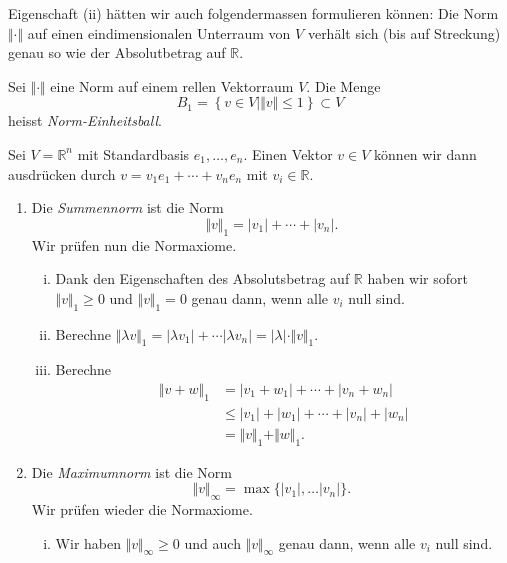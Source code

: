 \documentclass[../main.tex]{subfiles}
\begin{document}
Eigenschaft (ii) hätten wir auch folgendermassen formulieren können:
Die Norm $\Vert \cdot \Vert$ auf einen eindimensionalen Unterraum
von $V$ verhält sich (bis auf Streckung) genau so wie der Absolutbetrag
auf $\mathbb{R}$.

\begin{definition}
  Sei $\Vert \cdot \Vert$ eine Norm auf einem rellen Vektorraum $V$.
  Die Menge
  \[
    B_1 = \left\{v \in V \mid \Vert v \Vert \leq 1\right\} \subset V
  \]
  heisst \emph{Norm-Einheitsball}.
\end{definition}

\begin{examples}
  Sei $V = \mathbb{R}^n$ mit Standardbasis $e_1, \dots, e_n$.
  Einen Vektor $v \in V$ können wir dann ausdrücken durch
  $v = v_1 e_1 + \cdots + v_n e_n$ mit $v_i \in \mathbb{R}$.
  \begin{enumerate}[(1)]
    \item Die \emph{Summennorm} ist die Norm
      \[
        \Vert v \Vert_1 = |v_1| + \cdots + |v_n|.
      \]
      Wir prüfen nun die Normaxiome.
      \begin{enumerate}[(i)]
        \item Dank den Eigenschaften des
          Absolutsbetrag auf $\mathbb{R}$ haben wir sofort 
          $\Vert v \Vert_1 \geq 0$ 
          und $\Vert v \Vert_1 = 0$ genau dann, wenn alle $v_i$ null sind.
        \item Berechne $\Vert \lambda v \Vert_1
          = |\lambda v_1| + \cdots |\lambda v_n| = |\lambda| \cdot
          \Vert v \Vert_1$.
        \item Berechne
          \begin{align*}
            \Vert v + w \Vert_1
            &= |v_1 + w_1| + \cdots + |v_n + w_n| \\
            & \leq |v_1| + |w_1| + \cdots + |v_n| + |w_n| \\
            &= \Vert v \Vert_1 + \Vert w \Vert_1.
          \end{align*}
      \end{enumerate}
    \item Die \emph{Maximumnorm}
      ist die Norm
      \[
        \Vert v \Vert_{\infty}
        = \max \{ |v_1|, \dots |v_n|\}.
      \]
      Wir prüfen wieder die Normaxiome.
      \begin{enumerate}[(i)]
        \item Wir haben $\Vert v \Vert_{\infty} \geq 0$
          und auch $\Vert v \Vert_{\infty}$ genau dann,
          wenn alle $v_i$ null sind.

\end{enumerate}
\end{enumerate}
\end{examples}
\end{document}
